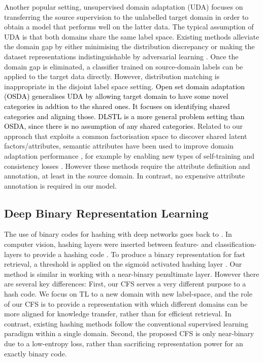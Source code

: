 \documentclass[letterpaper]{article} \usepackage{aaai19}  \usepackage{times}  \usepackage{helvet}  \usepackage{courier}  \usepackage{url}  \usepackage{graphicx}
\begin{document}
Another popular setting,  unsupervised domain adaptation (UDA)  focuses on transferring the source supervision to the unlabelled target domain in order to obtain a model that performs well on the latter data. The typical assumption of UDA is that both domains share the same label space. Existing methods alleviate the domain gap by either minimising the distribution discrepancy \cite{cao2018unsupervised,deep_coral} or making the dataset representations indistinguishable by adversarial learning \cite{adversarial_feat_cvpr17,ganin2016domain}. Once the domain gap is eliminated, a classifier trained on source-domain labels can be applied to the target data directly. However, distribution matching is inappropriate in the disjoint label space setting.
\textcolor{black}{Open set domain adaptation (OSDA) \cite{busto2017open} generalises UDA by allowing target domain to have some novel categories in addtion to the shared ones. It focuses on identifying shared categories and aligning those. DLSTL is a more general problem setting than OSDA, since there is no assumption of any shared categories.}
Related to our approach that exploits a common factorisation space to discover shared latent factors/attributes, semantic attributes have been used to improve domain adaptation performance \cite{su2016deep}, for example by enabling new types of self-training \cite{chen2015deep,attr_label_transfer_2018wang} and consistency losses \cite{gebru2017fine}. However these methods require the attribute definition and  annotation, at least in the source domain. In contrast, no expensive attribute annotation is required in our model.




\subsection{Deep Binary Representation Learning}

The use of binary codes for hashing with deep networks goes back to \cite{salakhutdinov2009semantic}. In computer vision, hashing layers were inserted between feature- and classification-layers to provide a hashing code \cite{lin2015deep,zhu2016deep}. To produce a binary representation for fast retrieval, a threshold is applied on the sigmoid activated hashing layer \cite{lin2015deep}. Our method is similar in working with a near-binary penultimate layer. However there are several key differences: First, 
our CFS serves a very different purpose to a hash code. We focus on TL to a new domain with new label-space, and the role of our CFS is to provide a representation with which  different domains can be more aligned for knowledge transfer, rather than for efficient retrieval. In contrast, existing hashing methods follow the conventional supervised learning paradigm within a single domain. Second, the proposed CFS is only near-binary due to a low-entropy loss, rather than sacrificing representation power for an exactly binary code.
\end{document}
